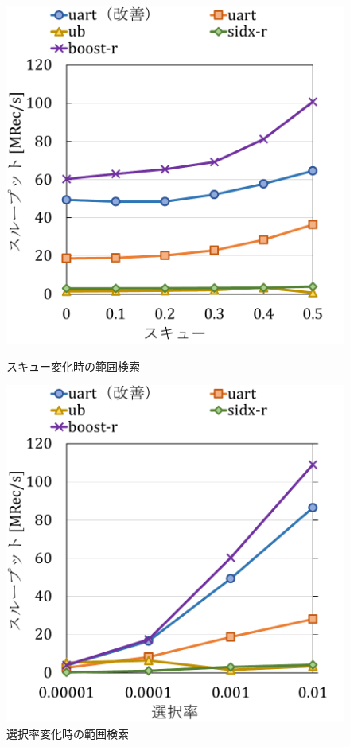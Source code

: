 \begin{figure}[tb]
  \begin{minipage}[c]{0.495\textwidth}
    \centering
    \includegraphics[scale=0.5]{./figures/graph-scan-skew.pdf}
    \caption{スキュー変化時の範囲検索}
    \label{graph:skew-sc}
  \end{minipage}
  \begin{minipage}[c]{0.495\textwidth}
    \centering
    \includegraphics[scale=0.5]{./figures/graph-scan-selectivity.pdf}
    \caption{選択率変化時の範囲検索}
    \label{graph:selectivity-sc}
  \end{minipage}
\end{figure}

